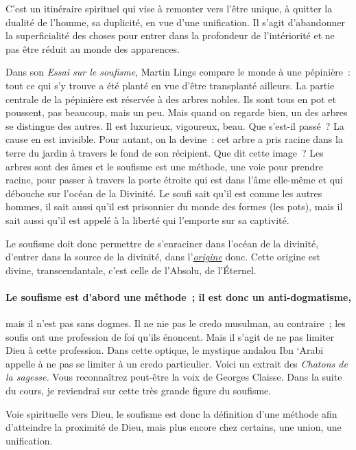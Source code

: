 C'est un itinéraire spirituel qui vise à remonter vers l'être unique, à
quitter la dualité de l'homme, sa duplicité, en vue d'une unification.
Il s'agit d'abandonner la superficialité des choses pour entrer dans la
profondeur de l'intériorité et ne pas être réduit au monde des
apparences.

Dans son \emph{Essai sur le soufisme}, Martin Lings compare le monde à
une pépinière~: tout ce qui s'y trouve a été planté en vue d'être
transplanté ailleurs. La partie centrale de la pépinière est réservée à
des arbres nobles. Ils sont tous en pot et poussent, pas beaucoup, mais
un peu. Mais quand on regarde bien, un des arbres se distingue des
autres. Il est luxurieux, vigoureux, beau. Que s'est-il passé~? La cause
en est invisible. Pour autant, on la devine~: cet arbre a pris racine
dans la terre du jardin à travers le fond de son récipient. Que dit
cette image~? Les arbres sont des âmes et le soufisme est une méthode,
une voie pour prendre racine, pour passer à travers la porte étroite qui
est dans l'âme elle-même et qui débouche sur l'océan de la Divinité. Le
soufi sait qu'il est comme les autres hommes, il sait aussi qu'il est
prisonnier du monde des formes (les pots), mais il sait aussi qu'il est
appelé à la liberté qui l'emporte sur sa captivité.

Le soufisme doit donc permettre de s'enraciner dans l'océan de la
divinité, d'entrer dans la source de la divinité, dans
l'\emph{\underline{origine}} donc. Cette origine est divine,
transcendantale, c'est celle de l'Absolu, de l'Éternel.

\paragraph{Le soufisme est d'abord une méthode~; il est donc un anti-dogmatisme,}
mais il n'est pas sans dogmes. Il ne nie pas le credo musulman, au
contraire~; les soufis ont une profession de foi qu'ils énoncent. Mais
il s'agit de ne pas limiter Dieu à cette profession. Dans cette optique,
le mystique andalou Ibn `Arabī appelle à ne pas se limiter à un credo
particulier. Voici un extrait des \emph{Chatons de la sagesse.} Vous
reconnaîtrez peut-être la voix de Georges Claisse. Dans la suite du
cours, je reviendrai sur cette très grande figure du soufisme.

Voie spirituelle vers Dieu, le soufisme est donc la définition d'une
méthode afin d'atteindre la proximité de Dieu, mais plus encore chez
certains, une union, une unification.

